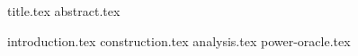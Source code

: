\documentclass[11pt]{llncs}
\begin{document}
{title.tex}
\thispagestyle{plain}
{abstract.tex}

{introduction.tex}
{construction.tex}
{analysis.tex}
{power-oracle.tex}


\end{document}
